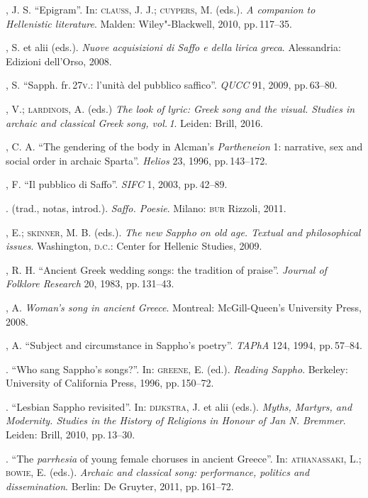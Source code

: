 \begin{bibliohedra}
, J. S. “Epigram”. In: \textsc{clauss}, J. J.; \textsc{cuypers}, M. (eds.). \textit{A companion to Hellenistic literature}. Malden: Wiley"-Blackwell, 2010, pp.\,117--35. 

, S. et alii (eds.). \textit{Nuove acquisizioni di Saffo e della lirica greca}. Alessandria: Edizioni dell'Orso, 2008.

, S. “Sapph. fr.\,27\textsc{v}.: l’unità del pubblico saffico”. \textit{QUCC} 91, 2009, pp.\,63--80.

, V.; \textsc{lardinois}, A. (eds.) \textit{The look of lyric: Greek song and the visual. Studies in archaic and classical Greek song, vol.\,1}. Leiden: Brill, 2016.

, C. A. “The gendering of the body in Alcman’s \textit{Partheneion} 1: narrative, sex and social order in archaic Sparta”. \textit{Helios} 23, 1996, pp.\,143--172.

, F. “Il pubblico di Saffo”. \textit{SIFC} 1, 2003, pp.\,42--89.

\titidem. (trad., notas, introd.). \textit{Saffo. Poesie}. Milano: \textsc{bur} Rizzoli, 2011.

, E.; \textsc{skinner}, M. B. (eds.). \textit{The new Sappho on old age. Textual and philosophical issues}. Washington, \textsc{d.c.}: Center for Hellenic Studies, 2009.

, R. H. “Ancient Greek wedding songs: the tradition of praise”. \textit{Journal of Folklore Research} 20, 1983, pp.\,131--43.

, A. \textit{Woman’s song in ancient Greece}. Montreal: McGill-Queen’s University Press, 2008. 

, A. “Subject and circumstance in Sappho’s poetry”. \textit{TAPhA} 124, 1994, pp.\,57--84.

\titidem. “Who sang Sappho’s songs?”. In: \textsc{greene}, E. (ed.). \textit{Reading Sappho}. Berkeley: University of California Press, 1996, pp.\,150--72.

\titidem. ``Lesbian Sappho revisited''. In: \textsc{dijkstra}, J. et alii (eds.). \textit{Myths, Martyrs, and Modernity. Studies in the History of Religions in Honour of Jan N. Bremmer}. Leiden: Brill, 2010, pp.\,13--30.

\titidem. “The \textit{parrhesia} of young female choruses in ancient Greece”. In: \textsc{athanassaki}, L.; \textsc{bowie}, E. (eds.). \textit{Archaic and classical song: performance, politics and dissemination}. Berlin: De Gruyter, 2011, pp.\,161--72. 


\end{bibliohedra}
